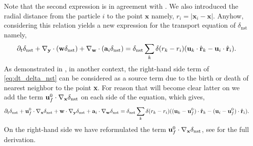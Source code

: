 Note that the second expression is in agreement with \citet[Appendix A]{zhang2021ensemble}. 
We also introduced the radial distance from the particle $i$ to the point $\textbf{x}$ namely, $r_i = |\textbf{x}_i - \textbf{x}|$.  
Anyhow, considering this relation yields a new expression for the transport equation of $\delta_\text{nst}$ namely,
\begin{equation}
    \partial_t \delta_\text{nst}
    + {\mathbf{\nabla}_\textbf{y}} \cdot (\textbf{w} \delta_\text{nst})
    + {\mathbf{\nabla}_\textbf{w}} \cdot (\textbf{a}_i  \delta_\text{nst})
    = 
    \delta_\text{nst}
    \sum_k 
    \delta(r_k - r_i)
    (\textbf{u}_k  \cdot \hat{\textbf{r}}_k - \textbf{u}_i  \cdot \hat{\textbf{r}}_i). 
\end{equation}
As demonstrated in \citet{zhang2023evolution}, in another context, the right-hand side term of \ref{eq:dt_delta_nst} can be considered as a source term due to the birth or death of nearest neighbor to the point \textbf{x}. 
For reason that will become clear latter on we add the term $\textbf{u}_f^0\cdot {\mathbf{\nabla}_\textbf{x}} \delta_\text{nst}$ on each side of the equation, which gives,
\begin{equation}
    \pddt \delta_\text{nst}
    + \textbf{u}_f^0\cdot \pddx \delta_\text{nst}
    + \textbf{w}   \cdot \pddy \delta_\text{nst}
    + \textbf{a}_i \cdot \pddw   \delta_\text{nst}
    = 
    \delta_\text{nst}
    \sum_k 
    \delta(r_k - r_i)
    ((\textbf{u}_k - \textbf{u}_f^0) \cdot \hat{\textbf{r}}_k - (\textbf{u}_i  - \textbf{u}_f^0)\cdot \hat{\textbf{r}}_i). 
    \label{eq:dt_delta_nst}
\end{equation}
On the right-hand side we have reformulated the term $\textbf{u}_f^0\cdot {\mathbf{\nabla}_\textbf{x}} \delta_\text{nst}$, see  for the full derivation. 

